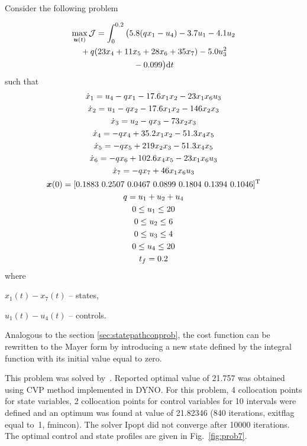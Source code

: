 Consider the following problem~\citep{luu90_52,bal01,fik02} 

\begin{gather}
\max_{\ve{u}(t)} \mf{J} =
\int_{0}^{0.2}\big(5.8(qx_{1}-u_{4})-3.7u_{1}-4.1u_{2}\nonumber\\ %
\mbox{}+q(23x_{4}+11x_{5}+28x_{6}+35x_{7})-5.0u_{3}^{2}\nonumber\\
\mbox{}-0.099\big)\dt \label{eq:cstr}
\end{gather}
such that
\begin{gather*}
\dot{x}_1  =  u_{4}-qx_{1}-17.6x_{1}x_{2}-23x_{1}x_{6}u_{3}\\
\dot{x}_2  =  u_{1}-qx_{2}-17.6x_{1}x_{2}-146x_{2}x_{3}\\
\dot{x}_3  =  u_{2}-qx_{3}-73x_{2}x_{3}\\
\dot{x}_4  =  -qx_{4}+35.2x_{1}x_{2}-51.3x_{4}x_{5}\\
\dot{x}_5  =  -qx_{5}+219x_{2}x_{3}-51.3x_{4}x_{5}\\
\dot{x}_6  =  -qx_{6}+102.6x_{4}x_{5}-23x_{1}x_{6}u_{3}\\
\dot{x}_7  =  -qx_{7}+46x_{1}x_{6}u_{3}\\
\ve{x}(0) = [0.1883~0.2507~0.0467~0.0899~0.1804~0.1394~0.1046]^{\textrm{T}}\\
q = u_{1}+u_{2}+u_{4}\\
0 \leq u_{1} \leq 20\\
0 \leq u_{2} \leq 6\\
0 \leq u_{3} \leq 4\\
0 \leq u_{4} \leq 20\\
t_{f}=0.2
\end{gather*}
where 
\begin{description}
\item $x_{1}(t) - x_{7}(t)$ -- states,
\item $u_{1}(t) - u_{4}(t)$ -- controls.
\end{description}
Analogous to the section \ref{sec:statepathconprob}, the cost function
can be rewritten to the Mayer form by introducing a new state defined
by the integral function with its initial value equal to zero.

This problem was solved by~\cite{fik02,jac69}. Reported optimal value
of 21.757 was obtained using CVP method implemented in DYNO. For this
problem, 4 collocation points for state variables, 2 collocation
points for control variables for 10 intervals were defined and an
optimum was found at value of 21.82346 (840 iterations, exitflag equal
to~1, fmincon). The solver Ipopt did not converge after 10000
iterations. The optimal control and state profiles are given in
Fig.~\ref{fig:prob7}.

